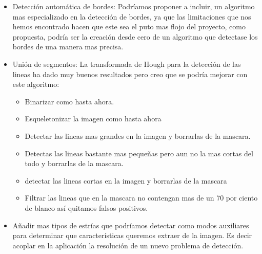 \begin{itemize}
	\item Detección automática de bordes: 
Podríamos proponer a incluir, un algoritmo mas especializado en la detección de bordes, ya que las limitaciones que nos hemos encontrado hacen que este sea el puto mas flojo del proyecto, como propuesta, podría ser la creación desde cero de un algoritmo que detectase los bordes de una manera mas precisa.

	\item Unión de segmentos: 
La transformada de Hough para la detección de las lineas ha dado muy buenos resultados pero creo que se podría mejorar con este algoritmo: 

	\begin{itemize}
		\item Binarizar como hasta ahora.
		\item Esqueletonizar la imagen como hasta ahora
		\item Detectar las lineas mas grandes en la imagen y borrarlas de la mascara.
		\item Detectas las lineas bastante mas pequeñas pero aun no la mas cortas del todo y borrarlas de la mascara.
		\item detectar las lineas cortas en la imagen y borrarlas de la mascara
		\item Filtrar las lineas que en la mascara no contengan mas de un 70 por ciento de blanco así quitamos falsos positivos.
	\end{itemize}
	\item Añadir mas tipos de estrías que podríamos detectar como modos auxiliares para determinar que características queremos extraer de la imagen. Es decir acoplar en la aplicación la resolución de un nuevo problema de detección.
	
\end{itemize}